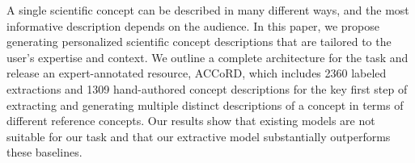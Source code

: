 A single scientific concept can be described in many different ways, and the most informative description depends on the audience. In this paper, we propose generating personalized scientific concept descriptions that are tailored to the user's expertise and context. We outline a complete architecture for the task and release an expert-annotated resource, ACCoRD, which includes 2360 labeled extractions and 1309 hand-authored concept descriptions for the key first step of extracting and generating multiple distinct descriptions of a concept in terms of different reference concepts. Our results show that existing models are not suitable for our task and that our extractive model substantially outperforms these baselines.
